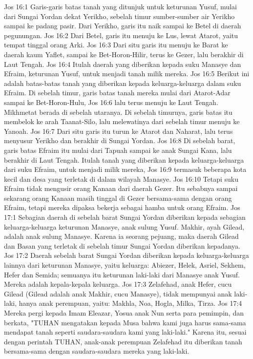 Jos 16:1  Garis-garis batas tanah yang ditunjuk untuk keturunan Yusuf, mulai dari Sungai Yordan dekat Yerikho, sebelah timur sumber-sumber air Yerikho sampai ke padang pasir. Dari Yerikho, garis itu naik sampai ke Betel di daerah pegunungan.
Jos 16:2  Dari Betel, garis itu menuju ke Lus, lewat Atarot, yaitu tempat tinggal orang Arki.
Jos 16:3  Dari situ garis itu menuju ke Barat ke daerah kaum Yaflet, sampai ke Bet-Horon-Hilir, terus ke Gezer, lalu berakhir di Laut Tengah.
Jos 16:4  Itulah daerah yang diberikan kepada suku Manasye dan Efraim, keturunan Yusuf, untuk menjadi tanah milik mereka.
Jos 16:5  Berikut ini adalah batas-batas tanah yang diberikan kepada keluarga-keluarga dalam suku Efraim. Di sebelah timur, garis batas tanah mereka mulai dari Atarot-Adar sampai ke Bet-Horon-Hulu,
Jos 16:6  lalu terus menuju ke Laut Tengah. Mikhmetat berada di sebelah utaranya. Di sebelah timurnya, garis batas itu membelok ke arah Taanat-Silo, lalu melewatinya dari sebelah timur menuju ke Yanoah.
Jos 16:7  Dari situ garis itu turun ke Atarot dan Naharat, lalu terus menyusur Yerikho dan berakhir di Sungai Yordan.
Jos 16:8  Di sebelah barat, garis batas Efraim itu mulai dari Tapuah sampai ke anak Sungai Kana, lalu berakhir di Laut Tengah. Itulah tanah yang diberikan kepada keluarga-keluarga dari suku Efraim, untuk menjadi milik mereka,
Jos 16:9  termasuk beberapa kota kecil dan desa yang terletak di dalam wilayah Manasye.
Jos 16:10  Tetapi suku Efraim tidak mengusir orang Kanaan dari daerah Gezer. Itu sebabnya sampai sekarang orang Kanaan masih tinggal di Gezer bersama-sama dengan orang Efraim, tetapi mereka dipaksa bekerja sebagai hamba untuk orang Efraim.
Jos 17:1  Sebagian daerah di sebelah barat Sungai Yordan diberikan kepada sebagian keluarga-keluarga keturunan Manasye, anak sulung Yusuf. Makhir, ayah Gilead, adalah anak sulung Manasye. Karena ia seorang pejuang, maka daerah Gilead dan Basan yang terletak di sebelah timur Sungai Yordan diberikan kepadanya.
Jos 17:2  Daerah sebelah barat Sungai Yordan diberikan kepada keluarga-keluarga lainnya dari keturunan Manasye, yaitu keluarga: Abiezer, Helek, Asriel, Sekhem, Hefer dan Semida; semuanya itu keturunan laki-laki dari Manasye anak Yusuf. Mereka adalah kepala-kepala keluarga.
Jos 17:3  Zelafehad, anak Hefer, cucu Gilead (Gilead adalah anak Makhir, cucu Manasye), tidak mempunyai anak laki-laki, hanya anak perempuan, yaitu: Makhla, Noa, Hogla, Milka, Tirza.
Jos 17:4  Mereka pergi kepada Imam Eleazar, Yosua anak Nun serta para pemimpin, dan berkata, "TUHAN mengatakan kepada Musa bahwa kami juga harus sama-sama mendapat tanah seperti saudara-saudara kami yang laki-laki." Karena itu, sesuai dengan perintah TUHAN, anak-anak perempuan Zelafehad itu diberikan tanah bersama-sama dengan saudara-saudara mereka yang laki-laki.
